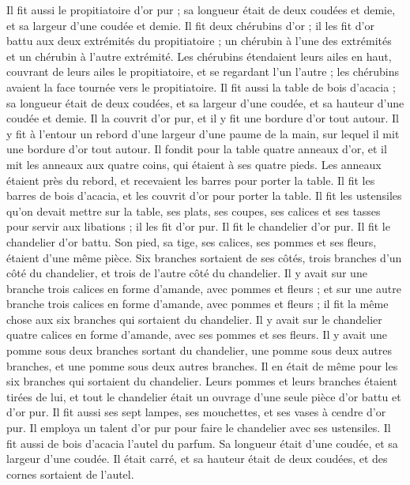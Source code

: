 \begin{multicols}{2}
Il fit aussi le propitiatoire d’or pur ; sa longueur était de deux coudées et demie, et sa largeur d'une coudée et demie.
Il fit deux chérubins d'or ; il les fit d’or battu aux deux extrémités du propitiatoire ;
un chérubin à l’une des extrémités et un chérubin à l’autre extrémité.
Les chérubins étendaient leurs ailes en haut, couvrant de leurs ailes le propitiatoire, et se regardant l’un l’autre ; les chérubins avaient la face tournée vers le propitiatoire.
Il fit aussi la table de bois d’acacia ; sa longueur était de deux coudées, et sa largeur d'une coudée, et sa hauteur d'une coudée et demie.
Il la couvrit d’or pur, et il y fit une bordure d’or tout autour.
Il y fit à l'entour un rebord d’une largeur d’une paume de la main, sur lequel il mit une bordure d’or tout autour.
Il fondit pour la table quatre anneaux d'or, et il mit les anneaux aux quatre coins, qui étaient à ses quatre pieds.
Les anneaux étaient près du rebord, et recevaient les barres pour porter la table.
Il fit les barres de bois d’acacia, et les couvrit d'or pour porter la table.
Il fit les ustensiles qu’on devait mettre sur la table, ses plats, ses coupes, ses calices et ses tasses pour servir aux libations ; il les fit d’or pur.
Il fit le chandelier d’or pur. Il fit le chandelier d’or battu. Son pied, sa tige, ses calices, ses pommes et ses fleurs, étaient d’une même pièce.
Six branches sortaient de ses côtés, trois branches d'un côté du chandelier, et trois de l'autre côté du chandelier.
Il y avait sur une branche trois calices en forme d'amande, avec pommes et fleurs ; et sur une autre branche trois calices en forme d'amande, avec pommes et fleurs ; il fit la même chose aux six branches qui sortaient du chandelier.
Il y avait sur le chandelier quatre calices en forme d'amande, avec ses pommes et ses fleurs.
Il y avait une pomme sous deux branches sortant du chandelier, une pomme sous deux autres branches, et une pomme sous deux autres branches. Il en était de même pour les six branches qui sortaient du chandelier.
Leurs pommes et leurs branches étaient tirées de lui, et tout le chandelier était un ouvrage d'une seule pièce d’or battu et d’or pur.
Il fit aussi ses sept lampes, ses mouchettes, et ses vases à cendre d’or pur.
Il employa un talent d’or pur pour faire le chandelier avec ses ustensiles.
Il fit aussi de bois d’acacia l'autel du parfum. Sa longueur était d'une coudée, et sa largeur d'une coudée. Il était carré, et sa hauteur était de deux coudées, et des cornes sortaient de l’autel.

\end{multicols}
